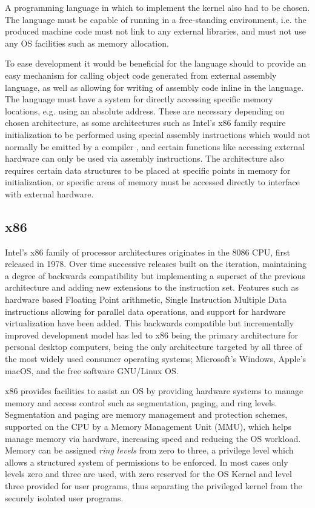 \documentclass[10pt]{report}
\begin{document}
A programming language in which to implement the kernel also had to be chosen. The language must be capable of running in a free-standing environment, i.e. the produced machine code must not link to any external libraries, and must not use any OS facilities such as memory allocation.

To ease development it would be beneficial for the language should to provide an easy mechanism for calling object code generated from external assembly language, as well as allowing for writing of assembly code inline in the language. The language must have a system for directly accessing specific memory locations, e.g. using an absolute address. These are necessary depending on chosen architecture, as some architectures such as Intel's x86 family require initialization to be performed using special assembly instructions which would not normally be emitted by a compiler \cite{guide2011intel}, and certain functions like accessing external hardware can only be used via assembly instructions. The architecture also requires certain data structures to be placed at specific points in memory for initialization, or specific areas of memory must be accessed directly to interface with external hardware.

\subsection{x86}
Intel's x86 family of processor architectures originates in the 8086 CPU, first released in 1978\cite{intel-hall-of-fame}. Over time successive releases built on the iteration, maintaining a degree of backwards compatibility but implementing a superset of the previous architecture and adding new extensions to the instruction set. Features such as hardware based Floating Point arithmetic, Single Instruction Multiple Data instructions allowing for parallel data operations, and support for hardware virtualization have been added. This backwards compatible but incrementally improved development model has led to x86 being the primary architecture for personal desktop computers, being the only architecture targeted by all three of the most widely used consumer operating systems; Microsoft's Windows, Apple's macOS, and the free software GNU/Linux OS.

x86 provides facilities to assist an OS by providing hardware systems to manage memory and access control such as segmentation, paging, and ring levels. Segmentation and paging are memory management and protection schemes, supported on the CPU by a Memory Management Unit (MMU), which helps manage memory via hardware, increasing speed and reducing the OS workload. Memory can be assigned \textit{ring levels} from zero to three, a privilege level which allows a structured system of permissions to be enforced. In most cases only levels zero and three are used, with zero reserved for the OS Kernel and level three provided for user programs, thus separating the privileged kernel from the securely isolated user programs.
\end{document}
